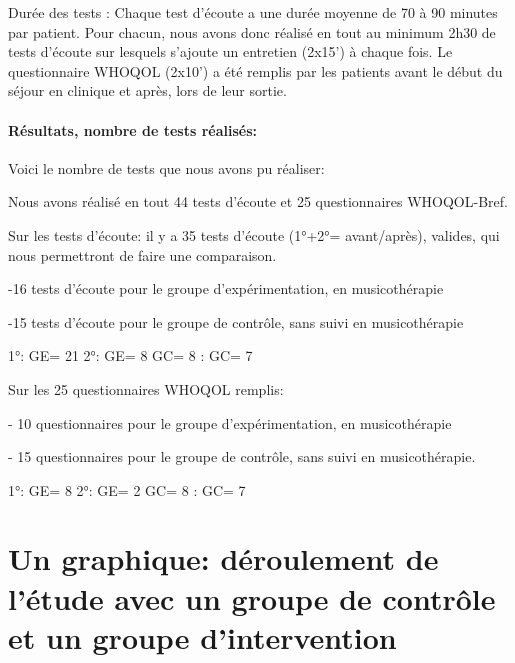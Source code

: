 	
	
	Durée des tests : Chaque test d'écoute a une durée  moyenne de
        70 à 90 minutes par patient. Pour chacun, nous avons donc réalisé
        en tout au minimum 2h30 de tests d'écoute sur lesquels
        s'ajoute un
        entretien (2x15') à chaque fois.
        Le questionnaire WHOQOL (2x10')  a été remplis par les
        patients avant le début du séjour en clinique et après, lors
        de leur sortie.
        
       
      
      \paragraph{Résultats, nombre de tests réalisés:}


        
        Voici le nombre de tests que nous avons pu réaliser:
        
     Nous avons réalisé en tout 44 tests d'écoute et 25 questionnaires 
     WHOQOL-Bref.
     
     Sur les tests d'écoute: il y a 35 tests d'écoute (1°+2°=
     avant/après), valides, qui nous permettront de faire une comparaison.
     
     -16 tests d'écoute pour le groupe d'expérimentation, en musicothérapie
     
     -15 tests d'écoute pour le groupe de contrôle, sans suivi en 
     musicothérapie

     1°: GE= 21                        2°: GE= 8
           GC= 8                             : GC= 7

     
           Sur les 25  questionnaires WHOQOL remplis:
           
     - 10 questionnaires pour le groupe d'expérimentation, en musicothérapie
     
     - 15 questionnaires pour le groupe de contrôle, sans suivi en 
     musicothérapie.

     
     1°: GE= 8                        2°: GE= 2
           GC= 8                           : GC= 7
     
     
    
 
     
          
 
 
 	
 	
       

 	
 	\section{Un graphique: déroulement de l'étude avec un groupe
          de contrôle et un groupe d'intervention}






